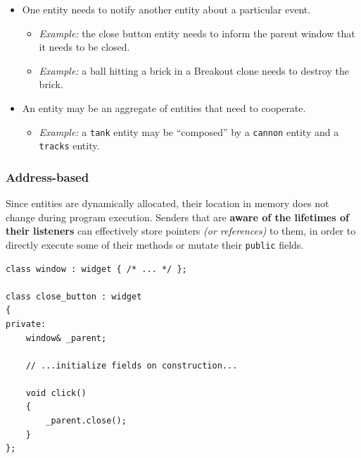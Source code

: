 \documentclass[twoside, 12pt, a4paper, openany]{book}
\providecommand{\tightlist}{%
  \setlength{\itemsep}{0pt}\setlength{\parskip}{0pt}}
\begin{document}
\begin{itemize}
\item
  One entity needs to notify another entity about a particular event.

  \begin{itemize}
  \item
    \emph{Example:} the close button entity needs to inform the parent
    window that it needs to be closed.
  \item
    \emph{Example:} a ball hitting a brick in a Breakout clone needs to
    destroy the brick.
  \end{itemize}
\item
  An entity may be an aggregate of entities that need to cooperate.

  \begin{itemize}
  \tightlist
  \item
    \emph{Example:} a
    \texttt{tank}
    entity may be ``composed'' by a
    \texttt{cannon}
    entity and a
    \texttt{tracks}
    entity.
  \end{itemize}
\end{itemize}

\subsubsection{Address-based}\label{address-based}

Since entities are dynamically allocated, their location in memory does
not change during program execution. Senders that are \textbf{aware of
the lifetimes of their listeners} can effectively store pointers
\emph{(or references)} to them, in order to directly execute some of
their methods or mutate their
\texttt{public}
fields.

\begin{verbatim}
class window : widget { /* ... */ };

class close_button : widget
{
private:
    window& _parent;

    // ...initialize fields on construction...

    void click()
    {
        _parent.close();
    }
};
\end{verbatim}
\end{document}
